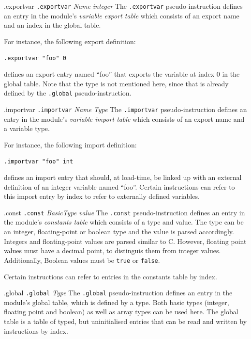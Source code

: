\begin{pseudo}{.exportvar}{
    \texttt{.exportvar} \emph{Name} \emph{integer}
}
The \texttt{.exportvar} pseudo-instruction defines an entry in the module's
\emph{variable export table} which consists of an export name and an index in
the global table.

For instance, the following export definition:

\qquad\texttt{.exportvar "foo" 0}

defines an export entry named ``foo'' that exports the variable at index 0 in the global table. Note that the type is not mentioned here, since that is already defined by the \texttt{.global} pseudo-instruction.
\end{pseudo}


\begin{pseudo}{.importvar}{
    \texttt{.importvar} \emph{Name} \emph{Type}
}
The \texttt{.importvar} pseudo-instruction defines an entry in the module's \emph{variable import table} which consists of an export name and a variable type.

For instance, the following import definition:

\qquad\texttt{.importvar "foo" int}

defines an import entry that should, at load-time, be linked up with an external definition of an integer variable named ``foo''. Certain instructions can refer to this import entry by index to refer to externally defined variables.
\end{pseudo}


\begin{pseudo}{.const}{
    \texttt{.const} \emph{BasicType} \emph{value}
}
The \texttt{.const} pseudo-instruction defines an entry in the module's \emph{constants table} which consists of a type and value. The type can be an integer, floating-point or boolean type and the value is parsed accordingly. Integers and floating-point values are parsed similar to C. However, floating point values must have a decimal point, to distinguis them from integer values. Additionally, Boolean values must be \texttt{true} or \texttt{false}.

Certain instructions can refer to entries in the constants table by index.
\end{pseudo}


\begin{pseudo}{.global}{
    \texttt{.global} \emph{Type}
}
The \texttt{.global} pseudo-instruction defines an entry in the module's global table, which is defined by a type. Both basic types (integer, floating point and boolean) as well as array types can be used here. The global table is a table of typed, but uninitialised entries that can be read and written by instructions by index.
\end{pseudo}


